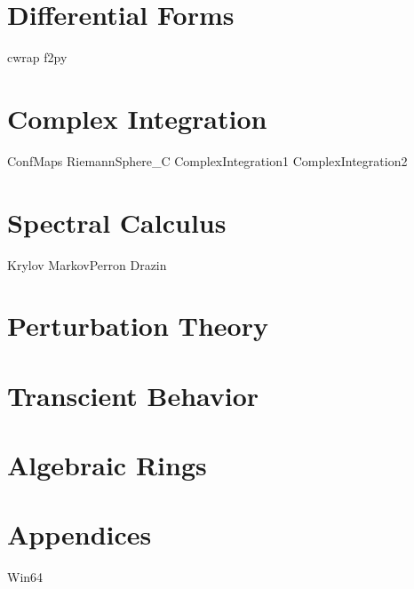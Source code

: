 \documentclass[nociteref]{newsiambook}
\begin{document}
\part{Differential Forms}
{cwrap}
{f2py}

\part{Complex Integration}
{ConfMaps}
{RiemannSphere_C}
{ComplexIntegration1}
{ComplexIntegration2}

\part{Spectral Calculus}
{Krylov}
{MarkovPerron}
{Drazin}

\part{Perturbation Theory}

\part{Transcient Behavior}

\part{Algebraic Rings}

\part{Appendices}
{Win64}
\end{document}
